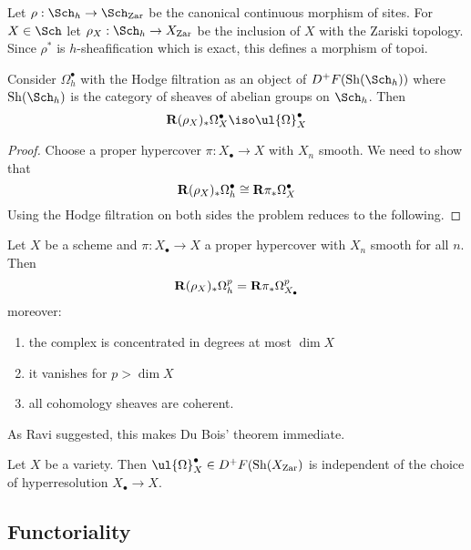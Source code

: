 \documentclass[12pt]{article}
\begin{document}
\begin{defn}
Let $\rho : \Sch_h \to \Sch_{\Zar}$ be the canonical continuous morphism of sites. For $X \in \Sch$ let $\rho_X : \Sch_h \to X_{\Zar}$ be the inclusion of $X$ with the Zariski topology. Since $\rho^*$ is $h$-sheafification which is exact, this defines a morphism of topoi. 
\end{defn}

\begin{theorem}[HJ Theorem 7.12]
Consider $\Omega^\bullet_h$ with the Hodge filtration as an object of $D^+ F(\Sh(\Sch_h))$ where $\Sh(\Sch_h)$ is the category of sheaves of abelian groups on $\Sch_h$. Then
\[ \R (\rho_X)_* \Omega^\bullet_X \iso \ul{\Omega}_X^\bullet \]
\end{theorem}

\begin{proof}
Choose a proper hypercover $\pi : X_\bullet \to X$ with $X_n$ smooth. We need to show that
\[ \mathbf{R} (\rho_X)_* \Omega_h^\bullet \cong \mathbf{R} \pi_* \Omega^\bullet_X \]
Using the Hodge filtration on both sides the problem reduces to the following.
\end{proof}

\begin{lemma}[HJ Lemma 6.16]
Let $X$ be a scheme and $\pi : X_\bullet \to X$ a proper hypercover with $X_n$ smooth for all $n$. Then
\[ \mathbf{R} (\rho_X)_* \Omega^p_h = \mathbf{R} \pi_* \Omega^p_{X_\bullet} \]
moreover:
\begin{enumerate}
\item the complex is concentrated in degrees at most $\dim{X}$
\item it vanishes for $p > \dim{X}$
\item all cohomology sheaves are coherent.
\end{enumerate}
\end{lemma}

As Ravi suggested, this makes Du Bois' theorem immediate. 

\begin{cor}
Let $X$ be a variety. Then $\ul{\Omega}_{X}^\bullet \in D^+ F(\Sh(X_{\Zar})$ is independent of the choice of hyperresolution $X_\bullet \to X$.
\end{cor}

\subsection{Functoriality}

\renewcommand{\big}{\mathrm{big}}
\renewcommand{\small}{\mathrm{small}}
\end{document}
